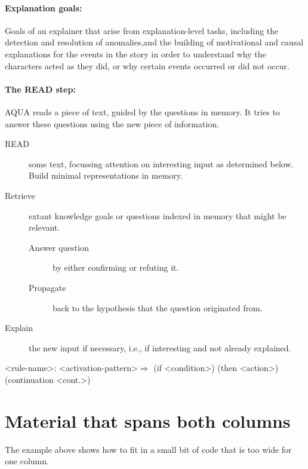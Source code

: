 \begin{article}
\paragraph{Explanation goals:}Goals of an explainer that arise from
explanation-level tasks, including the detection and resolution of
anomalies,and the building of motivational and causal explanations
for the events in the story in order to understand why the characters
acted as they did, or why certain events occurred or did not occur.

\paragraph{The READ step:}AQUA reads a piece of text, guided by the
questions in memory.  It tries to answer these questions using the
new piece of information.

\begin{itemize}
\begin{description}
\item[READ] some text, focussing attention on interesting input as
determined below. Build minimal representations in memory.

\item[Retrieve]extant knowledge goals or questions indexed in memory that 
might be relevant.
\begin{description}
\item[Answer question] by either confirming or refuting it.

\item[Propagate]back to the hypothesis that the question originated from.
\end{description}
\item[Explain]the new input if necessary, i.e., if interesting and
not already explained.
\end{description}
\end{itemize}

\spanbothcolumns[h]
\begin{codesamp}
	
           <rule-name>: <activation-pattern>$\Rightarrow$
           (if <condition>) (then <action>) (continuation <cont.>)

\end{codesamp}
\endspanbothcolumns

\section{Material that spans both columns}
The example above shows how to fit in a small bit of code that
is too wide for one column.


\end{article}
